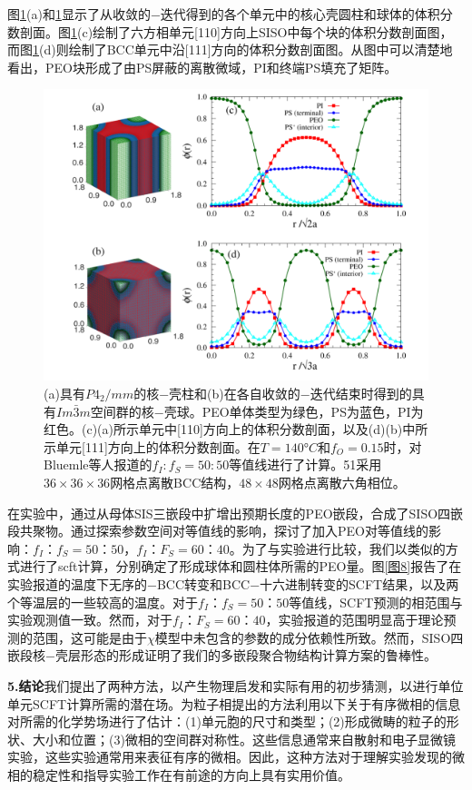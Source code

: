 \documentclass[12pt，a4paper]{article}
\numberwithin{equation}{section}
\begin{document}
图\ref{图7}(a)和\ref{图7}显示了从收敛的−迭代得到的各个单元中的核心壳圆柱和球体的体积分数剖面。图\ref{图7}(c)绘制了六方相单元[110]方向上SISO中每个块的体积分数剖面图，而图\ref{图7}(d)则绘制了BCC单元中沿[111]方向的体积分数剖面图。从图中可以清楚地看出，PEO块形成了由PS屏蔽的离散微域，PI和终端PS填充了矩阵。
\begin{figure}[H]
\centering
\includegraphics[scale=0.5]{./figures/7.png}
\caption{(a)具有$P4_2/mm$的核−壳柱和(b)在各自收敛的−迭代结束时得到的具有$Im\bar{3}m$空间群的核−壳球。PEO单体类型为绿色，PS为蓝色，PI为红色。(c)(a)所示单元中[110]方向上的体积分数剖面，以及(d)(b)中所示单元[111]方向上的体积分数剖面。在$T=140°C$和$f_O=0.15$时，对Bluemle等人报道的$f_I:f_S=50:50$等值线进行了计算。51采用$36\times 36\times 36$网格点离散BCC结构，$48\times 48$网格点离散六角相位。}
\label{图7}
\end{figure}
在实验中，通过从母体SIS三嵌段中扩增出预期长度的PEO嵌段，合成了SISO四嵌段共聚物。通过探索参数空间对等值线的影响，探讨了加入PEO对等值线的影响：$f_I：f_S=50：50$，$f_I：F_S=60：40$。为了与实验进行比较，我们以类似的方式进行了scft计算，分别确定了形成球体和圆柱体所需的PEO量。图\ref{图8}报告了在实验报道的温度下无序的−BCC转变和BCC−十六进制转变的SCFT结果，以及两个等温层的一些较高的温度。对于$f_I：f_S=50：50$等值线，SCFT预测的相范围与实验观测值一致。然而，对于$f_I：F_S=60：40$，实验报道的范围明显高于理论预测的范围，这可能是由于$\chi$模型中未包含的参数的成分依赖性所致。然而，SISO四嵌段核−壳层形态的形成证明了我们的多嵌段聚合物结构计算方案的鲁棒性。

\textbf{5.结论}我们提出了两种方法，以产生物理启发和实际有用的初步猜测，以进行单位单元SCFT计算所需的潜在场。为粒子相提出的方法利用以下关于有序微相的信息对所需的化学势场进行了估计：(1)单元胞的尺寸和类型；(2)形成微畴的粒子的形状、大小和位置；(3)微相的空间群对称性。这些信息通常来自散射和电子显微镜实验，这些实验通常用来表征有序的微相。因此，这种方法对于理解实验发现的微相的稳定性和指导实验工作在有前途的方向上具有实用价值。
\end{document}
